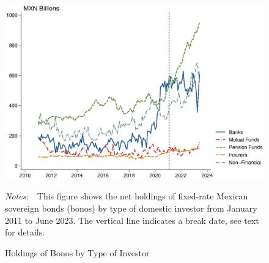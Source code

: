\documentclass[a4paper, 12pt]{article}
\newcommand{\figtext}[1]{
	\vspace{-1ex}
	\captionsetup{justification=justified,font=footnotesize}
	\caption*{#1}
}
\newcommand{\fignotes}[1]{\figtext{\emph{Notes:~}~#1}}
\providecommand{\lastobsflwbdm}{June 2023}
\begin{document}
\begin{appendices}
	\begin{figure}[!htb]
		\caption{Holdings of Bonos by Type of Investor} \label{fig:categsbnd}
		\begin{center}
			\begin{minipage}{0.9\linewidth}
				\begin{center}
					\includegraphics[width=1\textwidth,height=.3\textheight]{../Figures/categsbnd} \\
				\end{center}
				\fignotes{This figure shows the net holdings of fixed-rate Mexican sovereign bonds (bonos) by type of domestic investor from January 2011 to \lastobsflwbdm. The vertical line indicates a break date, see text for details.}
			\end{minipage}
		\end{center}
	\end{figure}
	

\end{appendices}
\end{document}
